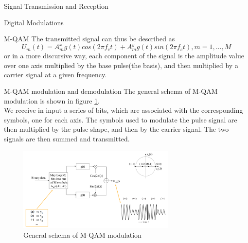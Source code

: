 \begin{section}{Signal Transmission and Reception}
\begin{subsection}{Digital Modulations}
\begin{subsubsection}{M-QAM}
      The transmitted signal can thus be described as
      \begin{equation}
        U_m(t)= A_m^xg(t)cos(2\pi f_c t)+A_m^yg(t)sin(2\pi f_c t),m=1,\dots,M
      \end{equation}
      or in a more discursive way, each component of the signal is the amplitude value over one axis
      multiplied by the base pulse(the basis), and then multiplied by a carrier signal at a 
      given frequency.\\
    \end{subsubsection}
    \begin{subsubsection}{M-QAM modulation and demodulation}
      The general schema of M-QAM modulation is shown in figure \ref{fig:MQAM modulation}.\\
      We receive in input a series of bits, which are associated with the corresponding symbols, 
      one for each axis. The symbols used to modulate the pulse signal are then multiplied by the
      pulse shape, and then by the carrier signal. The two signals are then summed and transmitted.\\

      \begin{figure}[h]
        \centering
        \includegraphics[width=0.7\textwidth]{img/wireless/MQAM modulation.png}
        \caption{General schema of M-QAM modulation}
        \label{fig:MQAM modulation}
      \end{figure}


\end{subsubsection}
\end{subsection}
\end{section}
